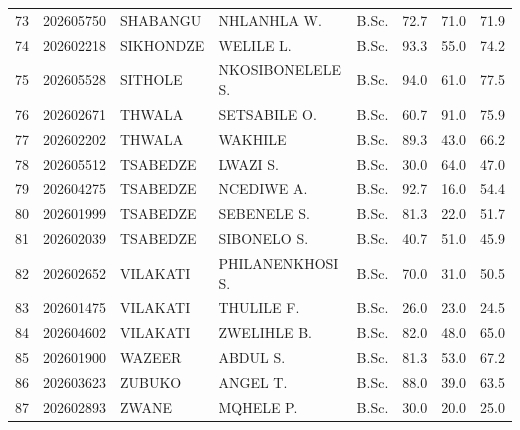 \documentclass[12pt]{article}
\begin{document}
\begin{longtable}{@{}llllllll@{}}
73 & 202605750 & SHABANGU & NHLANHLA W. & B.Sc. & 72.7 & 71.0 & 71.9 \\
74 & 202602218 & SIKHONDZE & WELILE L. & B.Sc. & 93.3 & 55.0 & 74.2 \\
75 & 202605528 & SITHOLE & NKOSIBONELELE S. & B.Sc. & 94.0 & 61.0 & 77.5 \\
76 & 202602671 & THWALA & SETSABILE O. & B.Sc. & 60.7 & 91.0 & 75.9 \\
77 & 202602202 & THWALA & WAKHILE & B.Sc. & 89.3 & 43.0 & 66.2 \\
78 & 202605512 & TSABEDZE & LWAZI S. & B.Sc. & 30.0 & 64.0 & 47.0 \\
79 & 202604275 & TSABEDZE & NCEDIWE A. & B.Sc. & 92.7 & 16.0 & 54.4 \\
80 & 202601999 & TSABEDZE & SEBENELE S. & B.Sc. & 81.3 & 22.0 & 51.7 \\
81 & 202602039 & TSABEDZE & SIBONELO S. & B.Sc. & 40.7 & 51.0 & 45.9 \\
82 & 202602652 & VILAKATI & PHILANENKHOSI S. & B.Sc. & 70.0 & 31.0 & 50.5 \\
83 & 202601475 & VILAKATI & THULILE F. & B.Sc. & 26.0 & 23.0 & 24.5 \\
84 & 202604602 & VILAKATI & ZWELIHLE B. & B.Sc. & 82.0 & 48.0 & 65.0 \\
85 & 202601900 & WAZEER & ABDUL S. & B.Sc. & 81.3 & 53.0 & 67.2 \\
86 & 202603623 & ZUBUKO & ANGEL T. & B.Sc. & 88.0 & 39.0 & 63.5 \\
87 & 202602893 & ZWANE & MQHELE P. & B.Sc. & 30.0 & 20.0 & 25.0 \\


\end{longtable}
\end{document}

